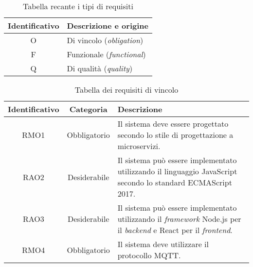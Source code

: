 \begin{table}[H]
\caption{Tabella recante i tipi di requisiti}
\label{tab:tipi-requisiti}
\begin{tabularx}{\linewidth}{|c|X|}
\hline
\textbf{Identificativo} & \textbf{Descrizione e origine} \\
\hline
O & Di vincolo (\emph{obligation}) \\
\hline
F & Funzionale (\emph{functional}) \\
\hline
Q & Di qualità (\emph{quality}) \\
\hline
\end{tabularx}
\end{table}



\begin{table}[H]
\caption{Tabella dei requisiti di vincolo}
\label{tab:requisiti-vincolo}
\begin{tabularx}{\linewidth}{|c|c|X|}
\hline
\textbf{Identificativo} & \textbf{Categoria} & \textbf{Descrizione} \\
\hline
RMO1 & Obbligatorio & Il sistema deve essere progettato secondo lo stile di progettazione a microservizi. \\
\hline
RAO2 & Desiderabile & Il sistema può essere implementato utilizzando il linguaggio JavaScript secondo lo standard ECMAScript 2017. \\
\hline
RAO3 & Desiderabile & Il sistema può essere implementato utilizzando il \emph{framework} Node.js per il \emph{backend} e React per il \emph{frontend}. \\
\hline
RMO4 & Obbligatorio & Il sistema deve utilizzare il protocollo MQTT. \\
\hline
\end{tabularx}
\end{table}


